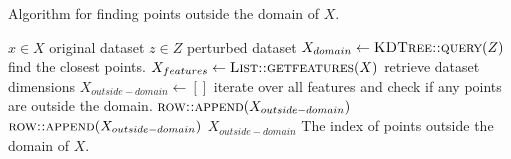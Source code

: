 \begin{algorithm}[H]
  \caption{Algorithm for finding points outside the domain of $X$.}
  \begin{algorithmic}
    \Require $x \in X$  \Comment original dataset
    \Require $z \in Z$ \Comment perturbed dataset
    \State $X_{domain} \gets \Call{KDTree::query}{Z}$ \Comment find the closest points.
    \State $X_{features} \gets \Call{List::getfeatures}{X}$ \Comment retrieve dataset dimensions
    \State $X_{outside-domain} \gets []$
     \Comment iterate over all features and check if any points are outside the domain.
    \State $\Call{row::append}{X_{outside-domain}}$
    \EndIf
    \State $\Call{row::append}{X_{outside-domain}}$
    \EndIf
    \EndFor
    \State \Return $X_{outside-domain}$ \Comment The index of points outside the domain of $X$.
  \end{algorithmic}
  \label{alg:find-outside-domain-laplace}
\end{algorithm}